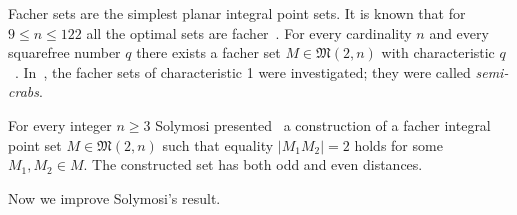 \documentclass[a4paper,14pt]{article} %
\theoremstyle{plain}
\theoremstyle{definition}
\begin{document}
Facher sets are the simplest planar integral point sets.
It is known that for $9\leq n \leq 122$ all the optimal sets are facher~\cite{kurz2008minimum}.
For every cardinality $n$ and every squarefree number $q$
there exists a facher set $M\in\mathfrak{M}(2,n)$ with characteristic $q$~\cite[Theorem 5]{our-vmmsh-2018-translit}.
In~\cite{antonov2008maximal}, the facher sets of characteristic 1 were investigated; they were called \textit{semi-crabs}.

For every integer $n\geq 3$ Solymosi presented~\cite{solymosi2003note} a construction of a facher integral point set
$M\in\mathfrak{M}(2,n)$
such that equality $|M_1 M_2| = 2$ holds for some $M_1, M_2 \in M$.
The constructed set has both odd and even distances.

Now we improve Solymosi's result.
\end{document}
